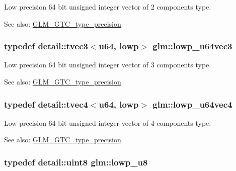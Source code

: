 Low precision 64 bit unsigned integer vector of 2 components type. \begin{Desc}
\item[See also:]\hyperlink{group__gtc__type__precision}{GLM\_\-GTC\_\-type\_\-precision} \end{Desc}
\hypertarget{group__gtc__type__precision_ga62794e3f055a333a85c0e52376f2429}{
\subsubsection[lowp\_\-u64vec3]{\setlength{\rightskip}{0pt plus 5cm}typedef detail::tvec3$<$u64, lowp$>$ {\bf glm::lowp\_\-u64vec3}}}
\label{group__gtc__type__precision_ga62794e3f055a333a85c0e52376f2429}


Low precision 64 bit unsigned integer vector of 3 components type. \begin{Desc}
\item[See also:]\hyperlink{group__gtc__type__precision}{GLM\_\-GTC\_\-type\_\-precision} \end{Desc}
\hypertarget{group__gtc__type__precision_g1dc6d791a39dc52ee296a891d5b9b084}{
\subsubsection[lowp\_\-u64vec4]{\setlength{\rightskip}{0pt plus 5cm}typedef detail::tvec4$<$u64, lowp$>$ {\bf glm::lowp\_\-u64vec4}}}
\label{group__gtc__type__precision_g1dc6d791a39dc52ee296a891d5b9b084}


Low precision 64 bit unsigned integer vector of 4 components type. \begin{Desc}
\item[See also:]\hyperlink{group__gtc__type__precision}{GLM\_\-GTC\_\-type\_\-precision} \end{Desc}
\hypertarget{group__gtc__type__precision_ge63f942c49a30dbf266b2f13f3efe257}{
\subsubsection[lowp\_\-u8]{\setlength{\rightskip}{0pt plus 5cm}typedef detail::uint8 {\bf glm::lowp\_\-u8}}}
\label{group__gtc__type__precision_ge63f942c49a30dbf266b2f13f3efe257}


